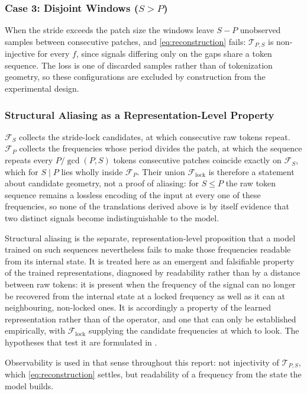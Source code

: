 \subsubsection{Case 3: Disjoint Windows ($S>P$)}
\label{sec:disjoint}
When the stride exceeds the patch size the windows leave $S-P$ unobserved samples between consecutive patches, and \autoref{eq:reconstruction} fails: $\mathcal{T}_{P,S}$ is non-injective for every $f$, since signals differing only on the gaps share a token sequence. The loss is one of discarded samples rather than of tokenization geometry, so these configurations are excluded by construction from the experimental design.

\subsubsection{Structural Aliasing as a Representation-Level Property}
$\mathcal{F}_{S}$ collects the stride-lock candidates, at which
consecutive raw tokens repeat. $\mathcal{F}_{P}$ collects the frequencies whose
period divides the patch, at which the sequence repeats every $P/\gcd(P,S)$ tokens
consecutive patches coincide exactly on $\mathcal{F}_{S}$, which for $S \mid P$ lies wholly inside $\mathcal{F}_{P}$.
Their union $\mathcal{F}_{\mathrm{lock}}$ is therefore a statement about
candidate geometry, not a proof of aliasing: for $S\le P$ the raw token
sequence remains a lossless encoding of the input at every one of these
frequencies, so none of the translations derived above is by itself evidence
that two distinct signals become indistinguishable to the model.

Structural aliasing is the separate, representation-level proposition that a
model trained on such sequences nevertheless fails to make those frequencies
readable from its internal state. It is treated here as an emergent and
falsifiable property of the trained
representations\autocite{paganiPreliminaryInsightsChronos2026}, diagnosed by
readability rather than by a distance between raw tokens: it is present when
the frequency of the signal can no longer be recovered from the internal state
at a locked frequency as well as it can at neighbouring, non-locked ones. It is
accordingly a property of the learned representation rather than of the
operator, and one that can only be established empirically, with
$\mathcal{F}_{\mathrm{lock}}$ supplying the candidate frequencies at which to
look. The hypotheses that test it are formulated in .

Observability is used in that sense throughout this report: not injectivity of
$\mathcal{T}_{P,S}$, which \autoref{eq:reconstruction} settles, but readability
of a frequency from the state the model builds.
